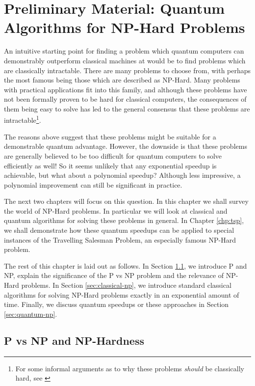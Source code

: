 \chapter{Preliminary Material: Quantum Algorithms for NP-Hard Problems}
\label{chp:prelim-q-c}

An intuitive starting point for finding a problem which quantum computers can demonstrably outperform classical machines at would be to find problems which are classically intractable. There are many problems to choose from, with perhaps the most famous being those which are described as NP-Hard. Many problems with practical applications fit into this family, and although these problems have not been formally proven to be hard for classical computers, the consequences of them being easy to solve has led to the general consensus that these problems are intractable\footnote{For some informal arguments as to why these problems \textit{should} be classically hard, see \cite{aaronson2006}}.

The reasons above suggest that these problems might be suitable for a demonstrable quantum advantage. However, the downside is that these problems are generally believed to be too difficult for quantum computers to solve efficiently as well! So it seems unlikely that any exponential speedup is achievable, but what about a polynomial speedup? Although less impressive, a polynomial improvement can still be significant in practice.

The next two chapters will focus on this question. In this chapter we shall survey the world of NP-Hard problems. In particular we will look at classical and quantum algorithms for solving these problems in general. In Chapter \ref{chp:tsp}, we shall demonstrate how these quantum speedups can be applied to special instances of the Travelling Salesman Problem, an especially famous NP-Hard problem.

The rest of this chapter is laid out as follows. In Section \ref{sec:p-vs-np}, we introduce P and NP, explain the significance of the P vs NP problem and the relevance of NP-Hard problems. In Section \ref{sec:classical-np}, we introduce standard classical algorithms for solving NP-Hard problems exactly in an exponential amount of time. Finally, we discuss quantum speedups or these approaches in Section \ref{sec:quantum-np}.

\section{P vs NP and NP-Hardness}
\label{sec:p-vs-np}

